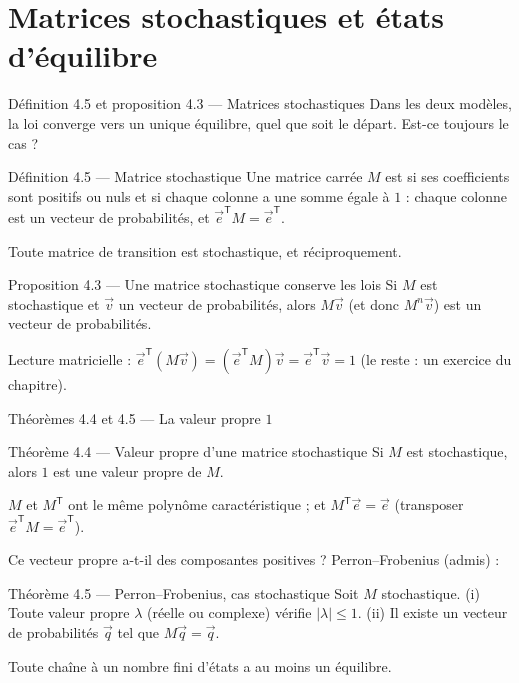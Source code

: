 \section{Matrices stochastiques et états d'équilibre}

\begin{frame}{Définition 4.5 et proposition 4.3 --- Matrices stochastiques}
  \small Dans les deux modèles, la loi converge vers un unique équilibre,
  quel que soit le départ. Est-ce toujours le cas ?
  \begin{Enonce}{Définition 4.5 --- Matrice stochastique}
    \small Une matrice carrée $M$ est  si ses
    coefficients sont positifs ou nuls et si chaque colonne a une somme
    égale à $1$ : chaque colonne est un vecteur de probabilités, et
    $\vec e^{\mathsf T}M=\vec e^{\mathsf T}$.
  \end{Enonce}
  \small Toute matrice de transition est stochastique, et réciproquement.
  \begin{Enonce}{Proposition 4.3 --- Une matrice stochastique conserve les lois}
    \small Si $M$ est stochastique et $\vec v$ un vecteur de probabilités,
    alors $M\vec v$ (et donc $M^n\vec v$) est un vecteur de probabilités.
  \end{Enonce}
  \small Lecture matricielle :
  $\vec e^{\mathsf T}(M\vec v)=(\vec e^{\mathsf T}M)\vec v
  =\vec e^{\mathsf T}\vec v=1$ (le reste : un exercice du chapitre).
\end{frame}

\begin{frame}{Théorèmes 4.4 et 4.5 --- La valeur propre $1$}
  \begin{Enonce}{Théorème 4.4 --- Valeur propre d'une matrice stochastique}
    \small Si $M$ est stochastique, alors $1$ est une valeur propre de $M$.
  \end{Enonce}
  \begin{AuTableau}
    \footnotesize $M$ et $M^{\mathsf T}$ ont le même polynôme
    caractéristique ; et $M^{\mathsf T}\vec e=\vec e$ (transposer
    $\vec e^{\mathsf T}M=\vec e^{\mathsf T}$).
  \end{AuTableau}
  \small Ce vecteur propre a-t-il des composantes positives ?
  Perron--Frobenius (admis) :
  \begin{Enonce}{Théorème 4.5 --- Perron--Frobenius, cas stochastique}
    \small Soit $M$ stochastique. (i) Toute valeur propre $\lambda$
    (réelle ou complexe) vérifie $|\lambda|\leq1$. (ii) Il existe un
    vecteur de probabilités $\vec q$ tel que $M\vec q=\vec q$.
  \end{Enonce}
  \footnotesize Toute chaîne à un nombre fini d'états a au moins un
  équilibre.
\end{frame}

